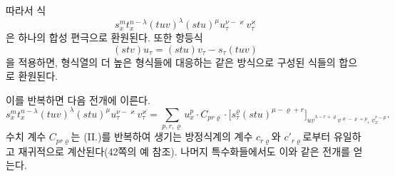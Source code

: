 
따라서 식
\[
s_x^m t_x^{n-\lambda}(tuv)^\lambda(stu)^\mu u_\tau^{\nu-\varkappa}v_\tau^\varkappa
\]
은 하나의 합성 편극으로 환원된다. 또한 항등식
\[
(stv)u_\tau=(stu)v_\tau-s_\tau(tuv)
\]
을 적용하면, 형식열의 더 높은 형식들에 대응하는 같은 방식으로 구성된 식들의 합으로 환원된다.

이를 반복하면 다음 전개에 이른다.
\[
\tag{III}
s_x^m t_x^{n-\lambda}(tuv)^\lambda(stu)^\mu u_\tau^{\nu-\varkappa}v_\tau^\varkappa
=
\sum_{p,r,\varrho}u_x^p\cdot C_{pr\varrho}\cdot
\bigl[s_\tau^\varrho(stu)^{\mu-\varrho+r}\bigr]_{\widehat{uv}^{\lambda-r+\varrho}v^{\varkappa-\varrho+p},\,v_x^{r-p}}.
\]
수치 계수 $C_{pr\varrho}$는 (II.)를 반복하여 생기는 방정식계의 계수 $c_{r\varrho}$와 $c'_{r\varrho}$로부터 유일하고 재귀적으로 계산된다(42쪽의 예 참조). 나머지 특수화들에서도 이와 같은 전개를 얻는다.
